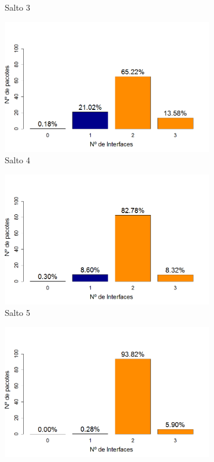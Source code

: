 \documentclass[
	12pt,				%
	openright,			%
	oneside,
	a4paper,			%
	english,			%
	french,				%
	spanish,			%
	brazil				%
	]{abntex2}
\begin{document}
\begin{figure}[htb]
\begin{subfigure}{.5\textwidth}
		\captionsetup{width=.9\textwidth}
		\caption{Salto 3}
		\label{dpr_no_opt_s3}
	\end{subfigure}%
	\begin{subfigure}{.5\textwidth}
		\centering
		\includegraphics[width=.98\linewidth]{DRP_Salto4}
		\captionsetup{width=.9\textwidth}
		\caption{Salto 4}
		\label{dpr_no_opt_s4}
	\end{subfigure}
	\begin{subfigure}{.5\textwidth}
		\centering
		\includegraphics[width=.98\linewidth]{DRP_Salto5}
		\captionsetup{width=.9\textwidth}
		\caption{Salto 5}
		\label{dpr_no_opt_s5}
	\end{subfigure}%
	\begin{subfigure}{.5\textwidth}
		\centering
		\includegraphics[width=.98\linewidth]{DRP_Salto6}

\end{subfigure}
\end{figure}
\end{document}
